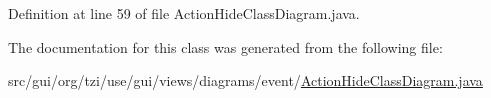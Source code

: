 Definition at line 59 of file Action\-Hide\-Class\-Diagram.\-java.



The documentation for this class was generated from the following file\-:\begin{DoxyCompactItemize}
\item 
src/gui/org/tzi/use/gui/views/diagrams/event/\hyperlink{_action_hide_class_diagram_8java}{Action\-Hide\-Class\-Diagram.\-java}\end{DoxyCompactItemize}
